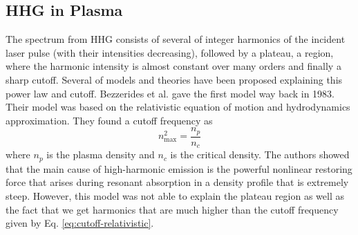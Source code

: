 \subsection{HHG in Plasma}
The spectrum from HHG consists of several of integer harmonics of the incident laser pulse (with their intensities decreasing), followed by a plateau, a region, where the harmonic intensity is almost constant over many orders and finally a sharp cutoff. Several of models and theories have been proposed explaining this power law and cutoff. Bezzerides et al.\cite{hhg-relativistic} gave the first model way back in 1983. Their model was based on the relativistic equation of motion and hydrodynamics approximation. They found a cutoff frequency as
\begin{equation}
    \label{eq:cutoff-relativistic}
    n_{\max}^2 = \frac{n_p}{n_c}
\end{equation}
where $n_p$ is the plasma density and $n_c$ is the critical density. The authors showed that the main cause of high-harmonic emission is the powerful nonlinear restoring force that arises during resonant absorption in a density profile that is extremely steep. However, this model was not able to explain the plateau region as well as the fact that we get harmonics that are much higher than the cutoff frequency given by Eq. \ref{eq:cutoff-relativistic}.

